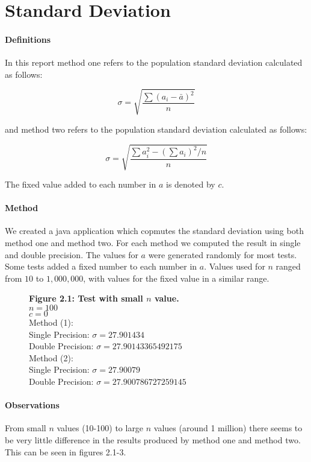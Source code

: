 \documentclass[12pt]{article}
\begin{document}
\section{Standard Deviation}
\paragraph{Definitions} In this report method one refers to the population standard deviation calculated as follows:

{\large $$\sigma=\sqrt{\frac{\sum(a_{i}-\bar{a})^2}{n}}$$}

and method two refers to the population standard deviation calculated as follows:

{\large $$\sigma=\sqrt{\frac{\sum a^{2}_{i}-(\sum a_{i})^2/n}{n}}$$}

The fixed value added to each number in $a$ is denoted by $c$.

\paragraph{Method} We created a java application which copmutes the standard deviation using both method one and method two. For each method we computed the result in single and double precision. The values for $a$ were generated randomly for most tests. Some tests added a fixed number to each number in $a$. Values used for $n$ ranged from $10$ to $1,000,000$, with values for the fixed value in a similar range.

\begin{figure}[h]
	\textbf{Figure 2.1: Test with small $n$ value.}\\
	$n=100$\\
	$c=0$\\
	
	Method (1):\\
	Single Precision: $\sigma=27.901434$\\
	Double Precision: $\sigma=27.90143365492175$\\
	
	Method (2):\\
	Single Precision: $\sigma=27.90079$\\
	Double Precision: $\sigma=27.900786727259145$
\end{figure}

\paragraph{Observations} From small $n$ values (10-100) to large $n$ values (around 1 million) there seems to be very little difference in the results produced by method one and method two. This can be seen in figures 2.1-3.
\end{document}
